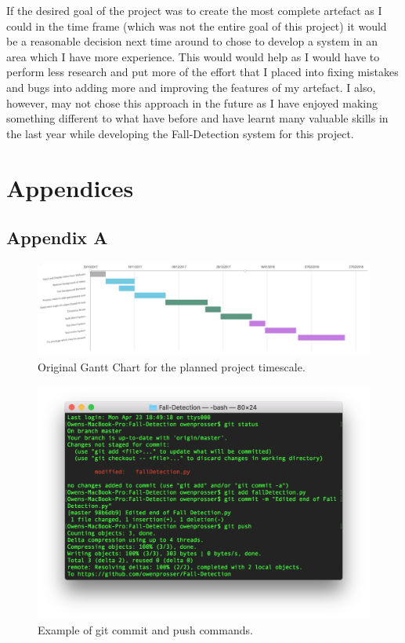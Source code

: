 \documentclass[11pt,a4paper]{report}
\begin{document}
If the desired goal of the project was to create the most complete artefact as I could in the time frame (which was not the entire goal of this project) it would be a reasonable decision next time around to chose to develop a system in an area which I have more experience. This would would help as I would have to perform less research and put more of the effort that I placed into fixing mistakes and bugs into adding more and improving the features of my artefact. I also, however, may not chose this approach in the future as I have enjoyed making something different to what have before and have learnt many valuable skills in the last year while developing the Fall-Detection system for this project.

\renewcommand\bibname{References}

\pagebreak
\clearpage

\appendix
\section{Appendices}
\subsection{Appendix A}

\begin{figure}[h]
 \centering
 \includegraphics[scale = 0.33]{Original_gantt_chart.png}
 \caption{Original Gantt Chart for the planned project timescale.}
 \label{fig:OriginalGantt}
\end{figure}

\begin{figure}[h]
 \centering
 \includegraphics[scale = 0.55]{gitpush.png}
 \caption{Example of git commit and push commands.}
 \label{fig:GitCommitPush}
\end{figure}
\end{document}
